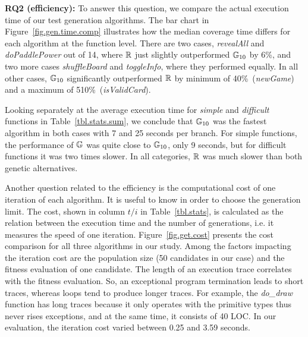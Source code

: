 \textbf{RQ2 (efficiency):} To answer this question, we compare the actual execution time of our test generation algorithms. The bar chart in Figure~\ref{fig.gen.time.comp} illustrates how the median coverage time differs for each algorithm at the function level. There are two cases, \emph{revealAll} and \emph{doPaddlePower} out of 14, where $\mathbb{R}$ just slightly outperformed $\mathbb{G}_{10}$ by 6\%, and two more cases \emph{shuffleBoard} and \emph{toggleInfo}, where they performed equally. In all other cases, $\mathbb{G}_{10}$ significantly outperformed $\mathbb{R}$ by minimum of 40\%~(\emph{newGame}) and a maximum of 510\%~(\emph{isValidCard}).

Looking separately at the average execution time for \emph{simple} and \emph{difficult} functions in Table~\ref{tbl.stats.sum}, we conclude that $\mathbb{G}_{10}$ was the fastest algorithm in both cases with  7 and 25 seconds per branch. For simple functions, the performance of $\mathbb{G}$ was quite close to $\mathbb{G}_{10}$, only 9 seconds, but for difficult functions it was two times slower. In all categories, $\mathbb{R}$ was much slower than both genetic alternatives.\\

Another question related to the efficiency is the computational cost of one iteration of each algorithm. It is useful to know in order to choose the generation limit. The cost, shown in column $t/i$ in Table~\ref{tbl.stats}, is calculated as the relation between the execution time and the number of generations, i.e. it measures the speed of one iteration. Figure~\ref{fig.get.cost} presents the cost comparison for all three algorithms in our study. Among the factors impacting the iteration cost are the population size (50 candidates in our case) and the fitness evaluation of one candidate. The length of an execution trace correlates with the fitness evaluation. So, an exceptional program termination leads to short traces, whereas loops tend to produce longer traces. For example, the \emph{do_draw} function has long traces because it only operates with the primitive types thus never rises exceptions, and at the same time, it consists of 40 LOC. In our evaluation, the iteration cost varied between 0.25 and 3.59 seconds.\\

